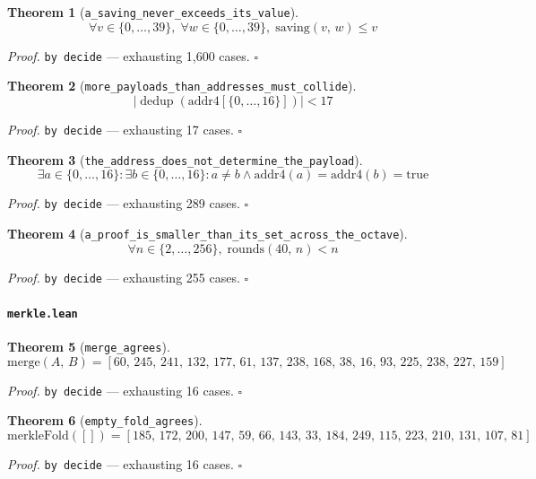 \documentclass[11pt]{article}
\newtheorem{theorem}{Theorem}[section]
\begin{document}
\begin{theorem}[\texttt{a\_saving\_never\_exceeds\_its\_value}]
\[ \forall v \in \{0,\dots,39\},\; \forall w \in \{0,\dots,39\},\; \mathrm{saving}\mathopen{}\left(v,\,w\right) \le v \]
\end{theorem}
\noindent\emph{Proof.} \texttt{by decide} --- exhausting 1,600 cases. \hfill$\square$

\begin{theorem}[\texttt{more\_payloads\_than\_addresses\_must\_collide}]
\[ \left|\operatorname{dedup}\left(\mathrm{addr4}[\{0,\dots,16\}]\right)\right| < 17 \]
\end{theorem}
\noindent\emph{Proof.} \texttt{by decide} --- exhausting 17 cases. \hfill$\square$

\begin{theorem}[\texttt{the\_address\_does\_not\_determine\_the\_payload}]
\[ \exists a \in \{0,\dots,16\} : \exists b \in \{0,\dots,16\} : a \neq b \land \mathrm{addr4}\mathopen{}\left(a\right) = \mathrm{addr4}\mathopen{}\left(b\right) = \mathrm{true} \]
\end{theorem}
\noindent\emph{Proof.} \texttt{by decide} --- exhausting 289 cases. \hfill$\square$

\begin{theorem}[\texttt{a\_proof\_is\_smaller\_than\_its\_set\_across\_the\_octave}]
\[ \forall n \in \{2,\dots,256\},\; \mathrm{rounds}\mathopen{}\left(40,\,n\right) < n \]
\end{theorem}
\noindent\emph{Proof.} \texttt{by decide} --- exhausting 255 cases. \hfill$\square$

\paragraph{\texttt{merkle.lean}}

\begin{theorem}[\texttt{merge\_agrees}]
\[ \mathrm{merge}\mathopen{}\left(A,\,B\right) = [60,\,245,\,241,\,132,\,177,\,61,\,137,\,238,\,168,\,38,\,16,\,93,\,225,\,238,\,227,\,159] \]
\end{theorem}
\noindent\emph{Proof.} \texttt{by decide} --- exhausting 16 cases. \hfill$\square$

\begin{theorem}[\texttt{empty\_fold\_agrees}]
\[ \mathrm{merkleFold}\mathopen{}\left([]\right) = [185,\,172,\,200,\,147,\,59,\,66,\,143,\,33,\,184,\,249,\,115,\,223,\,210,\,131,\,107,\,81] \]
\end{theorem}
\noindent\emph{Proof.} \texttt{by decide} --- exhausting 16 cases. \hfill$\square$
\end{document}
